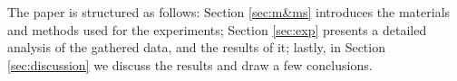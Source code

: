 The paper is structured as follows: Section \ref{sec:m&ms} introduces
the materials and methods used for the experiments; Section
\ref{sec:exp} presents a detailed analysis of the gathered data, and
the results of it; lastly, in Section \ref{sec:discussion} we discuss
the results and draw a few conclusions.
